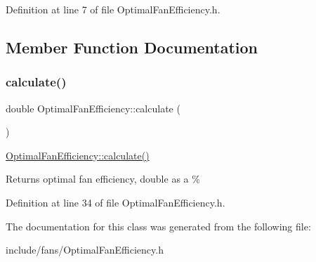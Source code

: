 Definition at line 7 of file Optimal\+Fan\+Efficiency.\+h.



\subsection{Member Function Documentation}
\mbox{\label{class_optimal_fan_efficiency_ac35291d1095c74373393ac510e45ae02}} 
\subsubsection{\texorpdfstring{calculate()}{calculate()}}
{\footnotesize\ttfamily double Optimal\+Fan\+Efficiency\+::calculate (\begin{DoxyParamCaption}{ }\end{DoxyParamCaption})\hspace{0.3cm}{\ttfamily [inline]}}

\hyperlink{class_optimal_fan_efficiency_ac35291d1095c74373393ac510e45ae02}{Optimal\+Fan\+Efficiency\+::calculate()} \begin{DoxyReturn}{Returns}
optimal fan efficiency, double as a \% 
\end{DoxyReturn}


Definition at line 34 of file Optimal\+Fan\+Efficiency.\+h.



The documentation for this class was generated from the following file\+:\begin{DoxyCompactItemize}
\item 
include/fans/Optimal\+Fan\+Efficiency.\+h\end{DoxyCompactItemize}
